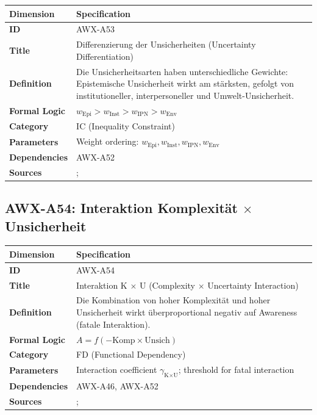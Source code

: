 \begin{table}[htbp]
\small
\begin{tabular}{p{3cm}p{11cm}}
\toprule
\textbf{Dimension} & \textbf{Specification} \\
\midrule
\textbf{ID} & AWX-A53 \\
\textbf{Title} & Differenzierung der Unsicherheiten (Uncertainty Differentiation) \\
\textbf{Definition} & Die Unsicherheitsarten haben unterschiedliche Gewichte: Epistemische Unsicherheit wirkt am stärksten, gefolgt von institutioneller, interpersoneller und Umwelt-Unsicherheit. \\
\textbf{Formal Logic} & $w_{\text{Epi}} > w_{\text{Inst}} > w_{\text{IPN}} > w_{\text{Env}}$ \\
\textbf{Category} & IC (Inequality Constraint) \\
\textbf{Parameters} & Weight ordering: $w_{\text{Epi}}, w_{\text{Inst}}, w_{\text{IPN}}, w_{\text{Env}}$ \\
\textbf{Dependencies} & AWX-A52 \\
\textbf{Sources} & \citet{knight1921risk}; \citet{camerer1992recent} \\
\bottomrule
\end{tabular}
\end{table}


\subsection{AWX-A54: Interaktion Komplexität $\times$ Unsicherheit}

\begin{table}[htbp]
\small
\begin{tabular}{p{3cm}p{11cm}}
\toprule
\textbf{Dimension} & \textbf{Specification} \\
\midrule
\textbf{ID} & AWX-A54 \\
\textbf{Title} & Interaktion K $\times$ U (Complexity $\times$ Uncertainty Interaction) \\
\textbf{Definition} & Die Kombination von hoher Komplexität und hoher Unsicherheit wirkt überproportional negativ auf Awareness (fatale Interaktion). \\
\textbf{Formal Logic} & $A = f(-\text{Komp} \times \text{Unsich})$ \\
\textbf{Category} & FD (Functional Dependency) \\
\textbf{Parameters} & Interaction coefficient $\gamma_{\text{K} \times \text{U}}$; threshold for fatal interaction \\
\textbf{Dependencies} & AWX-A46, AWX-A52 \\
\textbf{Sources} & \citet{PAP-simon1955behavioral}; \citet{gigerenzer2002bounded} \\
\bottomrule
\end{tabular}
\end{table}

